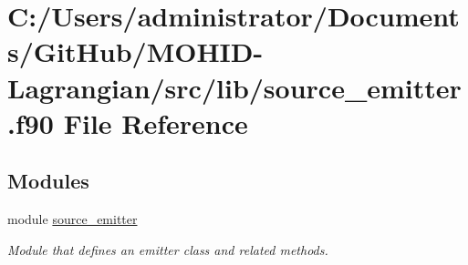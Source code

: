 \hypertarget{source__emitter_8f90}{}\section{C\+:/\+Users/administrator/\+Documents/\+Git\+Hub/\+M\+O\+H\+I\+D-\/\+Lagrangian/src/lib/source\+\_\+emitter.f90 File Reference}
\label{source__emitter_8f90}
\subsection*{Modules}
\begin{DoxyCompactItemize}
\item 
module \mbox{\hyperlink{namespacesource__emitter}{source\+\_\+emitter}}
\begin{DoxyCompactList}\small\item\em Module that defines an emitter class and related methods. \end{DoxyCompactList}\end{DoxyCompactItemize}
